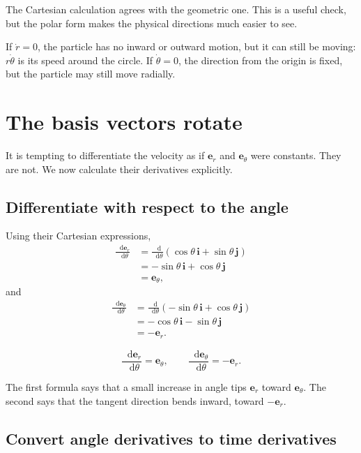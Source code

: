 \documentclass[11pt,a4paper]{article}
\newcommand{\er}{\bm e_r}
\newcommand{\etheta}{\bm e_\theta}
\newcommand{\ii}{\bm i}
\newcommand{\jj}{\bm j}
\newcommand{\dd}{\mathop{}\!\mathrm d}
\begin{document}
The Cartesian calculation agrees with the geometric one. This is a useful check, but the polar form makes the physical directions much easier to see.

\begin{idea}
If $\dot r=0$, the particle has no inward or outward motion, but it can still be moving: $r\dot\theta$ is its speed around the circle. If $\dot\theta=0$, the direction from the origin is fixed, but the particle may still move radially.
\end{idea}

\clearpage

\section{The basis vectors rotate}

It is tempting to differentiate the velocity as if $\er$ and $\etheta$ were constants. They are not. We now calculate their derivatives explicitly.

\subsection{Differentiate with respect to the angle}

Using their Cartesian expressions,
\begin{align*}
  \frac{\dd\er}{\dd\theta}
  &=\frac{\dd}{\dd\theta}
    (\cos\theta\,\ii+\sin\theta\,\jj)\\
  &=-\sin\theta\,\ii+\cos\theta\,\jj\\
  &=\etheta,
\end{align*}
and
\begin{align*}
  \frac{\dd\etheta}{\dd\theta}
  &=\frac{\dd}{\dd\theta}
    (-\sin\theta\,\ii+\cos\theta\,\jj)\\
  &=-\cos\theta\,\ii-\sin\theta\,\jj\\
  &=-\er.
\end{align*}

\begin{result}
\[
  \boxed{\frac{\dd\er}{\dd\theta}=\etheta},
  \qquad
  \boxed{\frac{\dd\etheta}{\dd\theta}=-\er}.
\]
\end{result}

The first formula says that a small increase in angle tips $\er$ toward $\etheta$. The second says that the tangent direction bends inward, toward $-\er$.

\subsection{Convert angle derivatives to time derivatives}
\end{document}
